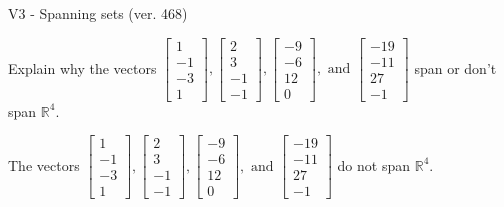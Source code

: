 \begin{exercise}
  \begin{exerciseTitle}V3 - Spanning sets (ver. 468)\end{exerciseTitle}
  \begin{exerciseStatement}
    Explain why the vectors \(\left[\begin{array}{r}
1 \\
-1 \\
-3 \\
1
\end{array}\right] , \left[\begin{array}{r}
2 \\
3 \\
-1 \\
-1
\end{array}\right] , \left[\begin{array}{r}
-9 \\
-6 \\
12 \\
0
\end{array}\right] , \text{ and } \left[\begin{array}{r}
-19 \\
-11 \\
27 \\
-1
\end{array}\right]\) span or don't span \(\mathbb{R}^4\). 
	


  \end{exerciseStatement}
  \begin{exerciseAnswer}
   The vectors \(\left[\begin{array}{r}
1 \\
-1 \\
-3 \\
1
\end{array}\right] , \left[\begin{array}{r}
2 \\
3 \\
-1 \\
-1
\end{array}\right] , \left[\begin{array}{r}
-9 \\
-6 \\
12 \\
0
\end{array}\right] , \text{ and } \left[\begin{array}{r}
-19 \\
-11 \\
27 \\
-1
\end{array}\right]\) 
  	 do not  
	span \(\mathbb{R}^4\).
  


  \end{exerciseAnswer}
\end{exercise}